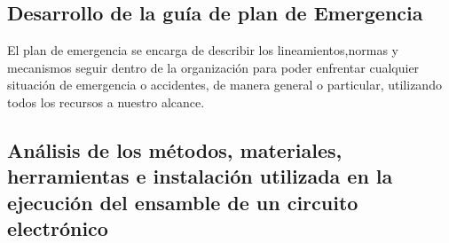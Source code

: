     \subsection{Desarrollo de la guía de plan de Emergencia}
    
    El plan de emergencia se encarga de describir los lineamientos,normas y mecanismos seguir dentro de la organización para poder enfrentar cualquier situación de emergencia o accidentes, de manera general o particular, utilizando todos los recursos a nuestro alcance. 
    \subsection{Análisis de los métodos, materiales, herramientas e instalación utilizada en la ejecución del ensamble de un circuito electrónico}
